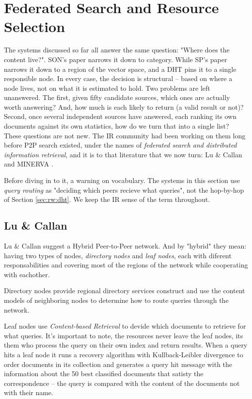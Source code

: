 \section{Federated Search and Resource Selection}
\label{sec:rw:federated}
The systems discussed so far all answer the same question: "Where does the content live?". SON's paper narrows it down to category. While SP's paper narrows it down to a region of the vector space, and a DHT pins it to a single responsible node. In every case, the decision is structural – based on where a node lives, not on what it is estimated to hold. Two problems are left unanswered. The first, given fifty candidate sources, which ones are actually worth answering? And, how much is each likely to return (a valid result or not)? Second, once several independent sources have answered, each ranking its own documents against its own statistics, how do we turn that into a single list? These questions are not new. The IR community had been working on them long before P2P search existed, under the names of \textit{federated search and distributed information retrieval}, and it is to that literature that we now turn: Lu \& Callan \cite{lu2003hybrid} and MINERVA \cite{bender2005minerva}.

Before diving in to it, a warning on vocabulary. The systems in this section use \textit{query routing} as "deciding which peers recieve what queries", not the hop-by-hop of Section \ref{sec:rw:dht}. We keep the IR sense of the term throughout.

\subsection{Lu \& Callan}
\label{sec:rw:LuCallan}
Lu \& Callan suggest a Hybrid Peer-to-Peer network. And by "hybrid" they mean: having two types of nodes, \textit{directory nodes} and \textit{leaf nodes}, each with diferent responsabilities and covering most of the regions of the network while cooperating with eachother. 

Directory nodes provide regional directory services construct and use the content models of neighboring nodes to determine how to route queries through the network.

Leaf nodes use \textit{Content-based Retrieval} to devide which documents to retrieve for what queries. It's important to note, the resources never leave the leaf nodes, its them who process the query on their own index and return results. When a query hits a leaf node it runs a recovery algorithm with Kullback-Leibler divergence to order documents in its collection and generates a query hit message with the information about the 50 best classified documents that satisty the correspondence – the query is compared with the content of the documents not with their name.

